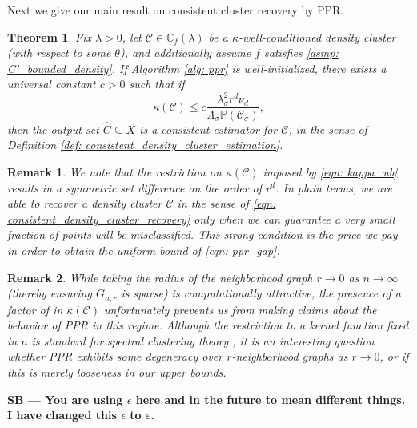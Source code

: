 \documentclass[11pt,twoside]{article}
\newtheorem{theorem}{Theorem}
\newtheorem*{remark}{Remark}
\newcommand{\1}{\mathbf{1}}
\newcommand{\Xbf}{X}             %
\newcommand{\Pbb}{\mathbb{P}}
\newcommand{\Cbb}{\mathbb{C}}
\newcommand{\Cset}{\mathcal{C}}
\newcommand{\Csig}{\Cset_{\sigma}}
\newcommand{\Cest}{\widehat{C}}
\newcommand{\sbcomment}[1]{{\color{red} \bf{{{{SB --- #1}}}}}}
\begin{document}
Next we give our main result on consistent cluster recovery by PPR.

\begin{theorem}
  \label{thm: consistent_recovery_of_density_clusters}
  Fix $\lambda > 0$, let $\Cset \in \Cbb_f(\lambda)$ be a
  $\kappa$-well-conditioned density cluster (with respect to some $\theta$), and
  additionally assume $f$ satisfies \ref{asmp: C'_bounded_density}. If Algorithm
  \ref{alg: ppr} is well-initialized, there exists a universal constant $c >  0$
  such that if  
  \begin{equation}
    \label{eqn: kappa_ub}
    \kappa(\Cset) \leq c \frac{\lambda_{\sigma}^2r^d
      \nu_d}{\Lambda_{\sigma}\Pbb(\Csig)}, 
  \end{equation}
  then the output set $\Cest \subseteq \Xbf$ is a consistent estimator for
  $\Cset$, in the sense of Definition \ref{def: consistent_density_cluster_estimation}. 
\end{theorem}

\begin{remark}
  We note that the restriction on $\kappa(\Cset)$ imposed by \eqref{eqn:
    kappa_ub} results in a symmetric set difference \smash{$\Delta(\Csig[\Xbf],
    \Cest)$} on the order of $r^d$. In plain terms, we are able to recover a
  density cluster $\Cset$ in the sense of \eqref{eqn:
    consistent_density_cluster_recovery} only when we can guarantee a very small
  fraction of points will be misclassified. This strong condition is the price
  we pay in order to obtain the uniform bound of \eqref{eqn: ppr_gap}. 
\end{remark}

\begin{remark}
  While taking the radius of the neighborhood graph $r \to 0$ as $n \to
  \infty$ (thereby ensuring $G_{n,r}$ is sparse) is computationally
  attractive, the presence of a factor of  in
  $\kappa(\Cset)$ unfortunately prevents us from making claims about the
  behavior of PPR in this regime. Although the restriction to a kernel
  function fixed in $n$ is standard for spectral clustering theory
  \citep{schiebinger2015,vonluxburg2008}, it is an interesting question whether
  PPR exhibits some degeneracy over $r$-neighborhood graphs as $r \to 0$, or if
  this is merely looseness in our upper bounds.  
\end{remark}

\sbcomment{You are using $\epsilon$ here and in the future to mean different things. I have
changed this $\epsilon$ to $\varepsilon$.} 
\end{document}
